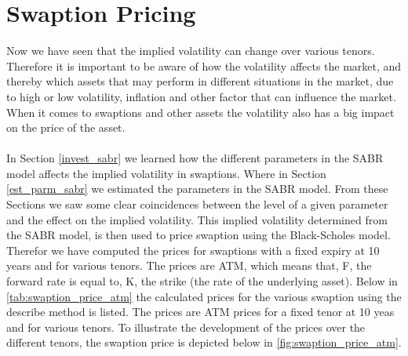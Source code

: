 \section{Swaption Pricing} \label{swaption_price_sec}
Now we have seen that the implied volatility can change over various tenors. 
Therefore it is important to be aware of how the volatility affects the market,
and thereby which assets that may perform in different situations in the market,
due to high or low volatility, inflation and other factor that can influence the market.
When it comes to swaptions and other assets the volatility also has
a big impact on the price of the asset. 
\\\\
In Section \ref{invest_sabr} we learned how the different parameters in the 
SABR model affects the implied volatility in swaptions. 
Where in Section \ref{est_parm_sabr} we estimated the parameters in the SABR model. 
From these Sections we saw some clear coincidences between the level of a given parameter
and the effect on the implied volatility. 
This implied volatility determined from the SABR model, is then used to price swaption using the 
Black-Scholes model. 
Therefor we have computed the prices for swaptions with a fixed expiry at 10 years and for various tenors. 
The prices are ATM, which means that, F, the forward rate is equal to, K, 
the strike (the rate of the underlying asset). 
Below in \autoref{tab:swaption_price_atm} the calculated prices for the various swaption 
using the describe method is listed. 
The prices are ATM prices for a fixed tenor at 10 yeas and for various tenors. 
To illustrate the development of the prices over the different tenors, 
the swaption price is depicted below in  \autoref{fig:swaption_price_atm}.
\begin{table}[H]
  \centering
  \caption{ATM swaption price in basis point for a 10 years fixed expiry and various tenors.
  \\ Data source Citi Velocity 21.02.2024}
  \label{tab:swaption_price_atm}
\end{table}
\noindent
